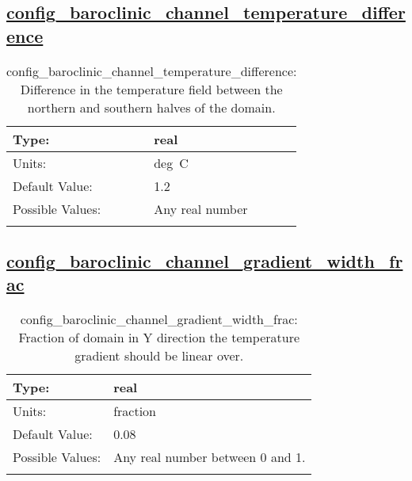 \subsection[config\_baroclinic\_channel\_temperature\_difference]{\hyperref[sec:nm_tab_baroclinic_channel]{config\_baroclinic\_channel\_temperature\_difference}}
\label{subsec:nm_sec_config_baroclinic_channel_temperature_difference}
\begin{center}
\begin{longtable}{| p{2.0in} || p{4.0in} |}
    \hline
    Type: & real \\
    \hline
    Units: & \si{deg.C} \\
    \hline
    Default Value: & 1.2 \\
    \hline
    Possible Values: & Any real number \\
    \hline
    \caption{config\_baroclinic\_channel\_temperature\_difference: Difference in the temperature field between the northern and southern halves of the domain.}
\end{longtable}
\end{center}
\subsection[config\_baroclinic\_channel\_gradient\_width\_frac]{\hyperref[sec:nm_tab_baroclinic_channel]{config\_baroclinic\_channel\_gradient\_width\_frac}}
\label{subsec:nm_sec_config_baroclinic_channel_gradient_width_frac}
\begin{center}
\begin{longtable}{| p{2.0in} || p{4.0in} |}
    \hline
    Type: & real \\
    \hline
    Units: & \si{fraction} \\
    \hline
    Default Value: & 0.08 \\
    \hline
    Possible Values: & Any real number between 0 and 1. \\
    \hline
    \caption{config\_baroclinic\_channel\_gradient\_width\_frac: Fraction of domain in Y direction the temperature gradient should be linear over.}
\end{longtable}
\end{center}
